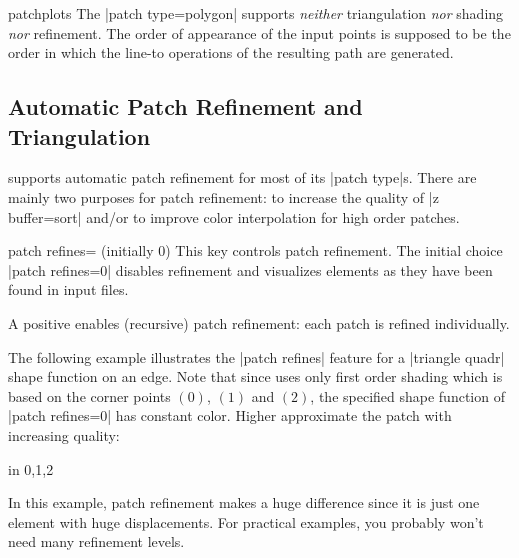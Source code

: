 {\begin{pgfplotslibrary}{patchplots}
The |patch type=polygon| supports \emph{neither} triangulation \emph{nor}
shading \emph{nor} refinement. The order of appearance of the input points is
supposed to be the order in which the line-to operations of the resulting path
are generated.


\subsection{Automatic Patch Refinement and Triangulation}
\label{sec:lib:patchplots:refinement}

\PGFPlots{} supports automatic patch refinement for most of its |patch type|s.
There are mainly two purposes for patch refinement: to increase the quality of
|z buffer=sort| and/or to improve color interpolation for high order patches.

\begin{pgfplotskey}{patch refines= (initially 0)}
    This key controls patch refinement. The initial choice |patch refines=0|
    disables refinement and visualizes elements as they have been found in
    input files.

    A positive  enables (recursive) patch refinement: each patch
    is refined individually.

    The following example illustrates the |patch refines| feature for a
    |triangle quadr| shape function on an edge. Note that since \PGFPlots{}
    uses only first order shading which is based on the corner points $(0)$,
    $(1)$ and $(2)$, the specified shape function of |patch refines=0| has
    constant color. Higher  approximate the patch with increasing
    quality:
\begin{codeexample}[]
\foreach \level in {0,1,2} {%
}
\end{codeexample}
    \noindent In this example, patch refinement makes a huge difference since
    it is just one element with huge displacements. For practical examples, you
    probably won't need many refinement levels.


\end{pgfplotskey}
\end{pgfplotslibrary}}
